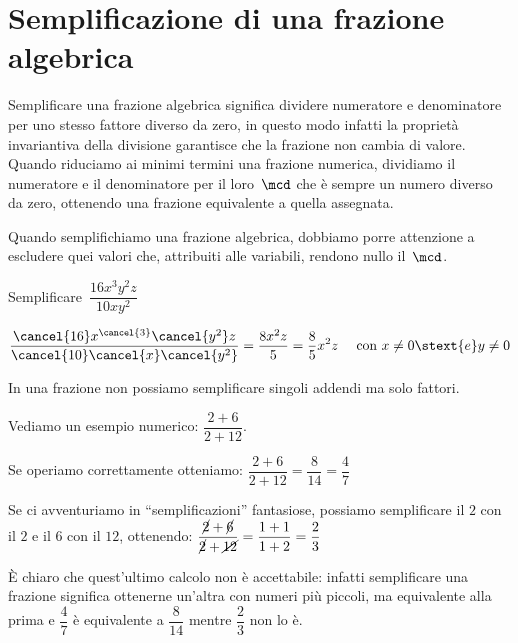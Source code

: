 \section{Semplificazione di una frazione 
algebrica}
\label{sec:frazalg_semplificazione}

Semplificare una frazione algebrica significa dividere numeratore e 
denominatore per uno stesso fattore diverso da zero, in questo modo infatti 
la proprietà invariantiva della divisione garantisce che la frazione non 
cambia di valore.
Quando riduciamo ai minimi termini una frazione numerica, dividiamo il 
numeratore e il denominatore per il loro~\(\mcd\) che è sempre un numero
diverso da zero, ottenendo una frazione equivalente a quella assegnata.

Quando semplifichiamo una frazione algebrica, dobbiamo 
porre attenzione a escludere quei valori che, attribuiti alle variabili, 
rendono nullo il~\(\mcd\).

\begin{esempio}{}{}
Semplificare~\(\dfrac{16x^{3}y^{2}z}{10xy^{2}}\)

\vspace{-.5em}
\[%
\dfrac{\cancel{16}x^{\cancel{3}}\cancel{y^{2}}z}
      {\cancel{10}\cancel{x}\cancel{y^{2}}}=
\dfrac{8x^{2}z}{5}=\dfrac{8}{5}x^{2}z
\quad \text{ con } x \ne 0 \stext{e} y \ne 0
\]
\end{esempio}

\begin{osservazione}{}{} 
In una frazione non possiamo semplificare singoli 
addendi ma solo fattori.
\end{osservazione}

Vediamo un esempio numerico: \quad \(\dfrac{2+6}{2+12}\). 

Se operiamo correttamente otteniamo: \quad
\(\dfrac{2+6}{2+12}=\dfrac{8}{14}=\dfrac{4}{7}\)

Se ci avventuriamo in ``semplificazioni'' fantasiose, possiamo 
semplificare il \(2\) con il \(2\) e il \(6\) con il 
\(12\), ottenendo: \quad
\(\dfrac{\cancel{2} +\cancel{6}}{\cancel{2} +\cancel{12}}=
\dfrac{1+1}{1+2}=\dfrac{2}{3}\)

È chiaro che quest'ultimo calcolo non è accettabile: infatti semplificare una 
frazione significa ottenerne un'altra con numeri più piccoli, ma equivalente 
alla prima e \(\dfrac{4}{7}\) è equivalente a \(\dfrac{8}{14}\) mentre 
\(\dfrac{2}{3}\) non lo è.

